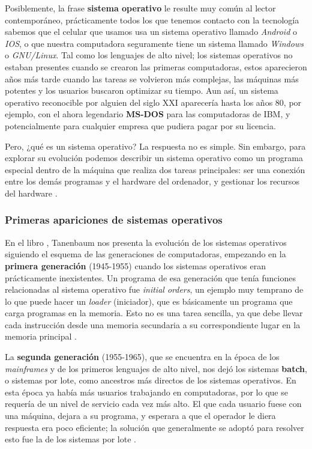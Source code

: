 \documentclass[letterpaper,12pt,oneside]{book}
\begin{document}
		Posiblemente, la frase \textbf{sistema operativo} le resulte muy común al lector contemporáneo, prácticamente todos los que tenemos contacto con
		la tecnología sabemos que el celular que usamos usa un sistema operativo llamado \textit{Android} o \textit{IOS}, o que nuestra computadora seguramente tiene
		un sistema llamado \textit{Windows} o  \textit{GNU/Linux}. Tal como los lenguajes
		de alto nivel; los sistemas operativos no estaban presentes cuando se crearon las primeras computadoras, estos aparecieron años más tarde cuando
		las tareas se volvieron más complejas, las máquinas más potentes y los usuarios buscaron optimizar su tiempo. Aun así, un sistema operativo
		reconocible por alguien del siglo XXI aparecería hasta los años 80, por ejemplo, con el ahora legendario \textbf{MS-DOS} para las computadoras de IBM, y potencialmente
		para cualquier empresa que pudiera pagar por su licencia.
		
		Pero, ¿qué es un sistema operativo? La respuesta no es simple. Sin embargo, para explorar su evolución podemos describir un sistema operativo como un programa especial 
		dentro de la máquina que realiza dos tareas principales: ser una conexión entre los demás programas y el hardware del ordenador, 
		y gestionar los recursos del hardware \cite{tanenbaum_modern_2002}.

        \subsubsection{Primeras apariciones de sistemas operativos}
        
		En el libro \cite{tanenbaum_modern_2002}, Tanenbaum nos presenta la evolución de los sistemas operativos siguiendo
		el esquema de las generaciones de computadoras, empezando en
		la \textbf{primera generación} (1945-1955) cuando los sistemas operativos eran prácticamente inexistentes. Un programa
        de esa generación que tenía funciones relacionadas al sistema operativo fue
    \textit{initial orders}, un ejemplo
		muy temprano de lo que puede hacer un \textit{loader} (iniciador), que es básicamente un programa que carga programas en la memoria. Esto no es una tarea sencilla,
		ya que debe llevar cada instrucción desde una memoria secundaria a su correspondiente lugar en la memoria principal \cite{salomon_assemblers_1992}.
		
		La \textbf{segunda generación} (1955-1965), que se encuentra en la época de los \textit{mainframes} y de los primeros lenguajes de alto nivel, nos dejó
		los sistemas \textbf{batch}, o sistemas por lote, como ancestros más directos de los sistemas operativos. En esta época ya había más usuarios trabajando en computadoras, por
		lo que se requería de un nivel de servicio cada vez más alto. El que cada usuario fuese con una máquina, dejara a su programa, y esperara a que el operador  le diera
		respuesta era poco eficiente; la solución que generalmente se adoptó para resolver esto fue la de los sistemas por lote \cite{tanenbaum_modern_2002}.
  
\end{document}
